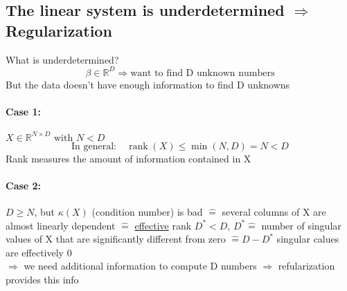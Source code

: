 \documentclass[11pt]{article}
\DeclareMathOperator{\rank}{rank}
\begin{document}
    \subsection{The linear system is underdetermined $\Rightarrow$ Regularization}
    What is underdetermined?
    \begin{equation*}
      \beta \in \mathbb{R}^D \Rightarrow \text{want to find D unknown numbers}
    \end{equation*}
    But the data doesn't have enough information to find D unknowns
    \paragraph{Case 1:} $X \in \mathbb{R}^{N\times D} \text{ with } N<D$
    \begin{equation*}
      \text{In general:} \quad \rank(X) \leq \min(N,D)=N<D
    \end{equation*}
    Rank measures the amount of information contained in X
    \paragraph{Case 2:} $D\geq N$, but $\kappa(X)$ (condition number) is bad
    $\widehat{=}$ several columns of X are almost linearly dependent $\widehat{=}
    $ \underline{effective} rank $D^* <D$, $D^* \widehat{=}$ number of singular
    values of X that are significantly different from zero $\widehat{=}D-D^*$
    singular calues are effectively 0 \\
    $\Rightarrow$ we need additional information to compute D numbers $\Rightarrow$
    refularization provides this info
\end{document}
